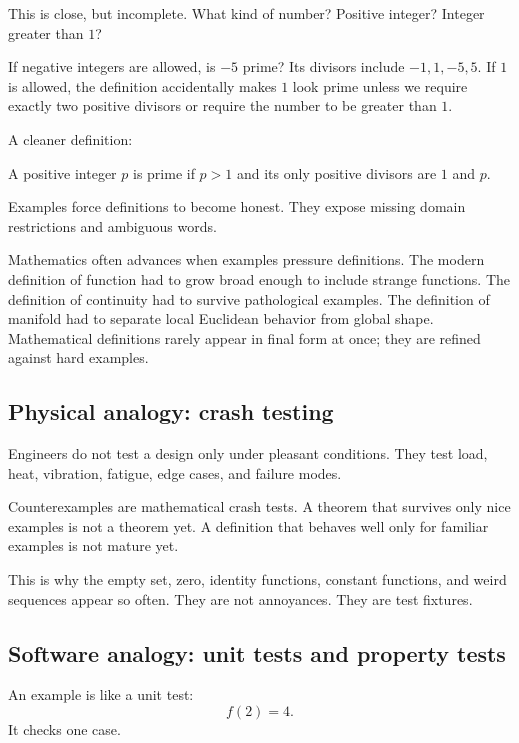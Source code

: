 This is close, but incomplete. What kind of number? Positive integer? Integer greater than $1$?

If negative integers are allowed, is $-5$ prime? Its divisors include $-1,1,-5,5$. If $1$ is allowed, the definition accidentally makes $1$ look prime unless we require exactly two positive divisors or require the number to be greater than $1$.

A cleaner definition:

\begin{definition}
A positive integer $p$ is prime if $p>1$ and its only positive divisors are $1$ and $p$.
\end{definition}

Examples force definitions to become honest. They expose missing domain restrictions and ambiguous words.

\begin{historybox}
Mathematics often advances when examples pressure definitions. The modern definition of function had to grow broad enough to include strange functions. The definition of continuity had to survive pathological examples. The definition of manifold had to separate local Euclidean behavior from global shape. Mathematical definitions rarely appear in final form at once; they are refined against hard examples.
\end{historybox}

\subsection{Physical analogy: crash testing}

Engineers do not test a design only under pleasant conditions. They test load, heat, vibration, fatigue, edge cases, and failure modes.

Counterexamples are mathematical crash tests. A theorem that survives only nice examples is not a theorem yet. A definition that behaves well only for familiar examples is not mature yet.

This is why the empty set, zero, identity functions, constant functions, and weird sequences appear so often. They are not annoyances. They are test fixtures.

\subsection{Software analogy: unit tests and property tests}

An example is like a unit test:
\[
f(2)=4.
\]
It checks one case.

